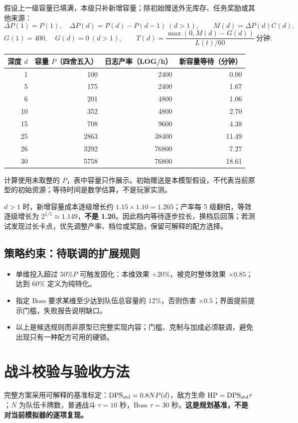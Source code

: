 \documentclass[UTF8,10pt,a4paper,fontset=fandol]{ctexart}
\newcommand{\note}[1]{{\small\color{ink}#1}}
\begin{document}
假设上一级容量已填满，本级只补新增容量；除初始赠送外无库存、任务奖励或其他来源：
\[
\Delta P(1)=P(1),\quad\Delta P(d)=P(d)-P(d-1)\ (d>1),\qquad M(d)=\Delta P(d)C(d),
\]
\[
G(1)=400,\quad G(d)=0\ (d>1),\qquad T(d)=\frac{\max(0,M(d)-G(d))}{L(t)/60}\ \text{分钟}.
\]
\begin{center}
\begin{tabular}{rrrr}\toprule
深度 $d$ & 容量 $P$（四舍五入） & 日志产率（LOG/h） & 新容量等待（分钟）\\\midrule
1 & 100 & 2400 & 0.00\\
5 & 175 & 2400 & 1.67\\
6 & 201 & 4800 & 1.06\\
10 & 352 & 4800 & 2.70\\
15 & 708 & 9600 & 4.38\\
25 & 2863 & 38400 & 11.49\\
26 & 3292 & 76800 & 7.27\\
30 & 5758 & 76800 & 18.61\\\bottomrule
\end{tabular}
\end{center}
\note{计算使用未取整的 $P$，表中容量只作展示。初始赠送是本模型假设，不代表当前原型的初始资源；等待时间是数学估算，不是玩家实测。}

$d>1$ 时，新增容量成本逐级增长约 $1.15\times1.10=1.265$；产率每 5 级翻倍，等效逐级增长为 $2^{1/5}\approx1.149$，\textbf{不是 1.20}。因此档内等待逐步拉长，换档后回落；若测试发现过长卡点，优先调整产率、档位或奖励，保留可解释的配方选择。

\subsection{策略约束：待联调的扩展规则}
\begin{itemize}
\item 单维投入超过 $50\%P$ 可触发固化：本维效果 $+20\%$，被克时整体效果 $\times0.85$；达到 $60\%$ 定义为纯特化。
\item 指定 Boss 要求某维至少达到队伍总容量的 $12\%$，否则伤害 $\times0.5$；界面提前提示门槛，失败报告说明缺口。
\item 以上是候选规则而非原型已完整实现内容；门槛、克制与加成必须联调，避免出现只有一种配方可用的硬锁。
\end{itemize}

\newpage
\section{战斗校验与验收方法}
完整方案采用可解释的基准标定：$\mathrm{DPS}_{\rm std}=0.8NP(d)$，敌方生命 $\mathrm{HP}=\mathrm{DPS}_{\rm std}\tau$；$N$ 为队伍卡牌数，普通战斗 $\tau=10$ 秒，Boss $\tau=30$ 秒。\textbf{这是规划基准，不是对当前模拟器的逐项复现。}
\end{document}

